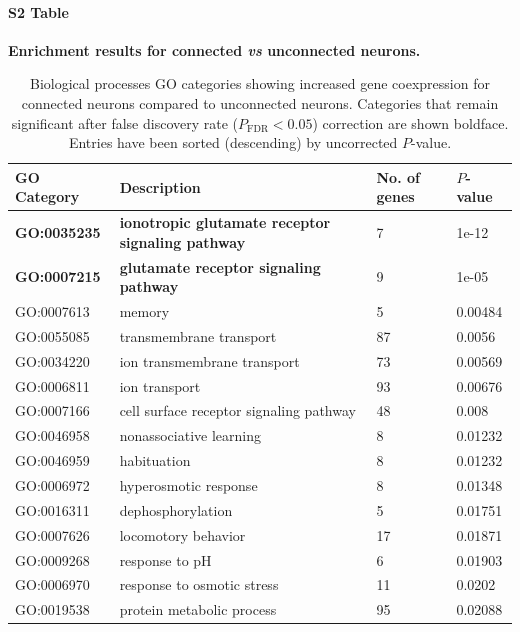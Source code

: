 \documentclass[10pt,letterpaper]{article}
\begin{document}
\paragraph*{S2 Table}
{\bf Enrichment results for connected \textit{vs} unconnected neurons.} 
\begin{table}[]
\centering
\caption{
Biological processes GO categories showing increased gene coexpression for connected neurons compared to unconnected neurons. 
Categories that remain significant after false discovery rate ($P_\mathrm{FDR} < 0.05$) correction are shown boldface.
Entries have been sorted (descending) by uncorrected $P$-value.
}
\label{enrichmentCON}
\begin{tabular}{llll}
\hline
\textbf{GO Category} & \textbf{Description}    & \textbf{No. of genes} & \textbf{$P$-value} \\ \hline
\textbf{GO:0035235}     		& \textbf{ionotropic glutamate receptor signaling pathway} & 7                 & 1e-12         \\
\textbf{GO:0007215}          	& \textbf{glutamate receptor signaling pathway}            & 9                 & 1e-05         \\ \hline
GO:0007613          & memory                                          & 5                 & 0.00484       \\
GO:0055085          & transmembrane transport                         & 87                & 0.0056        \\
GO:0034220          & ion transmembrane transport                     & 73                & 0.00569       \\
GO:0006811          & ion transport                                   & 93                & 0.00676       \\
GO:0007166          & cell surface receptor signaling pathway         & 48                & 0.008         \\
GO:0046958          & nonassociative learning                         & 8                 & 0.01232       \\
GO:0046959          & habituation                                     & 8                 & 0.01232       \\
GO:0006972          & hyperosmotic response                           & 8                 & 0.01348       \\
GO:0016311          & dephosphorylation                               & 5                 & 0.01751       \\
GO:0007626          & locomotory behavior                             & 17                & 0.01871       \\
GO:0009268          & response to pH                                  & 6                 & 0.01903       \\
GO:0006970          & response to osmotic stress                      & 11                & 0.0202        \\
GO:0019538          & protein metabolic process                       & 95                & 0.02088      
\end{tabular}
\end{table}
\end{document}
